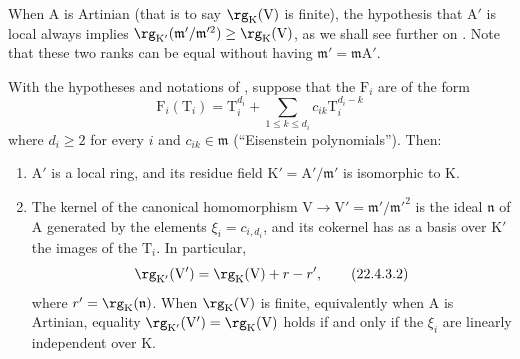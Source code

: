 
\begin{remark}[22.4.2]
\label{0.22.4.2}
When $\mathrm{A}$ is Artinian (that is to say $\rg_\mathrm{K}(\mathrm{V})$ is finite), the hypothesis that $\mathrm{A}'$ is local always implies $\rg_{\mathrm{K}'}(\mathfrak{m}'/\mathfrak{m}'^2)\geq\rg_\mathrm{K}(\mathrm{V})$, as we shall see further on .
Note that these two ranks can be equal without having $\mathfrak{m}'=\mathfrak{m}\mathrm{A}'$.
\end{remark}

\begin{proposition}[22.4.3]
\label{0.22.4.3}
With the hypotheses and notations of , suppose that the $\mathrm{F}_i$ are of the form
\[
\label{0.22.4.3.1}
  \mathrm{F}_i(\mathrm{T}_i)=\mathrm{T}_i^{d_i}+\sum_{1\leq k\leq d_i}c_{ik}\mathrm{T}_i^{d_i-k}
  \tag{22.4.3.1}
\]
where $d_i\geq 2$ for every $i$ and $c_{ik}\in\mathfrak{m}$ (``Eisenstein polynomials'').
Then:
\begin{enumerate}
  \item[\rm{(i)}] $\mathrm{A}'$ is a local ring, and its residue field $\mathrm{K}'=\mathrm{A}'/\mathfrak{m}'$ is isomorphic to $\mathrm{K}$.
  \item[\rm{(ii)}] The kernel of the canonical homomorphism $\mathrm{V}\to\mathrm{V}'=\mathfrak{m}'/\mathfrak{m}'^2$ is the ideal $\mathfrak{n}$ of $\mathrm{A}$ generated by the elements $\xi_i=c_{i,d_i}$, and its cokernel has as a basis over $\mathrm{K}'$ the images of the $\mathrm{T}_i$.
  In particular,
  \begin{equation}
  \label{0.22.4.3.2}
    \rg_{\mathrm{K}'}(\mathrm{V}')=\rg_\mathrm{K}(\mathrm{V})+r-r',
    \tag{22.4.3.2}
  \end{equation}
  where $r'=\rg_\mathrm{K}(\mathfrak{n})$.
  When $\rg_\mathrm{K}(\mathrm{V})$ is finite, equivalently when $\mathrm{A}$ is Artinian, equality $\rg_{\mathrm{K}'}(\mathrm{V}')=\rg_\mathrm{K}(\mathrm{V})$ holds if and only if the $\xi_i$ are linearly independent over $\mathrm{K}$.
\end{enumerate}
\end{proposition}

